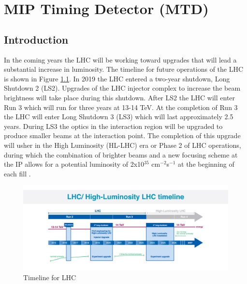 \chapter{MIP Timing Detector (MTD)}
\section{Introduction}

In the coming years the LHC will be working toward upgrades that will lead a substantial increase in luminosity.  The timeline for future operations of the LHC is shown in Figure \ref{fig:lhctimeline}.  In 2019 the LHC entered a two-year shutdown, Long Shutdown 2 (LS2).  Upgrades of the LHC injector complex to increase the beam brightness will take place during this shutdown.  After LS2 the LHC will enter Run 3 which will run for three years at 13-14 TeV.  At the completion of Run 3 the LHC will enter Long Shutdown 3 (LS3) which will last approximately 2.5 years.  During LS3 the optics in the interaction region will be upgraded to produce smaller beams at the interaction point.  The completion of this upgrade will usher in the High Luminosity (HL-LHC) era or Phase 2 of LHC operations, during which the combination of brighter beams and a new focusing scheme at the IP allows for a potential luminosity of 2x10$^{35}$ cm$^{-2}$s$^{-1}$ at the beginning of each fill \cite{Apollinari:2017cqg}.  

\begin{figure}[h]
	\centering
	\includegraphics[width=1.0\linewidth]{Figures/LHCTimeline}
	\caption[Timeline for LHC]{Timeline for LHC \cite{DeMelis:2063307}}
	\label{fig:lhctimeline}
\end{figure}

